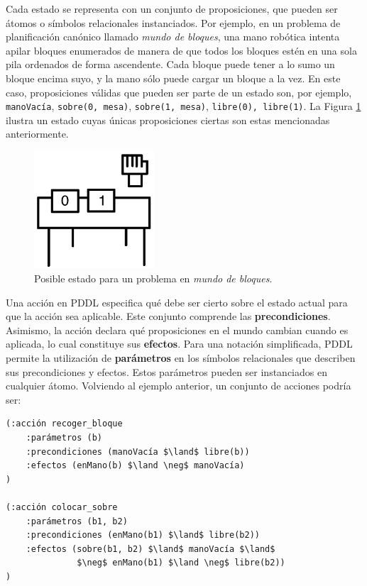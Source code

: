 Cada estado se representa con un conjunto de proposiciones, que pueden ser
átomos o símbolos relacionales instanciados. Por ejemplo, en un problema de
planificación canónico llamado \textit{mundo de bloques}, una mano
robótica intenta apilar bloques enumerados de manera de que todos los bloques
estén en una sola pila ordenados de forma ascendente. Cada bloque puede tener a
lo sumo un bloque encima suyo, y la mano sólo puede cargar un bloque a la vez.
En este caso, proposiciones válidas que pueden ser parte de un estado son,
por ejemplo,
\texttt{manoVacía}, \texttt{sobre(0, mesa)}, \texttt{sobre(1, mesa)}, \texttt{libre(0),
\texttt{libre(1)}}.
La Figura \ref{blocksworld_inicial} ilustra un estado cuyas únicas
proposiciones ciertas son estas mencionadas anteriormente.
\begin{figure}[h!]
\centering
\includegraphics[width=0.4\textwidth]{figuras/blocksworld_inicial.png}
\caption{Posible estado para un problema en \textit{mundo de bloques}.}
\label{blocksworld_inicial}
\end{figure}

Una acción en PDDL especifica qué debe ser cierto sobre el estado actual para
que la acción sea aplicable. 
Este conjunto comprende las \textbf{precondiciones}. Asimismo,
la acción declara qué proposiciones en el mundo cambian cuando es aplicada,
lo cual constituye sus \textbf{efectos}. Para una notación
simplificada, PDDL permite la utilización de \textbf{parámetros} en los
símbolos relacionales que describen sus precondiciones y efectos. Estos
parámetros pueden ser instanciados en cualquier átomo. Volviendo al
ejemplo anterior, un conjunto de acciones podría ser:
\begin{Verbatim}[commandchars=\\\{\},
codes={\catcode`$=3\catcode`^=7}]
(:acción recoger_bloque
    :parámetros (b)
    :precondiciones (manoVacía $\land$ libre(b))
    :efectos (enMano(b) $\land \neg$ manoVacía)
)

(:acción colocar_sobre
    :parámetros (b1, b2)
    :precondiciones (enMano(b1) $\land$ libre(b2))
    :efectos (sobre(b1, b2) $\land$ manoVacía $\land$
              $\neg$ enMano(b1) $\land \neg$ libre(b2))
)
\end{Verbatim}

